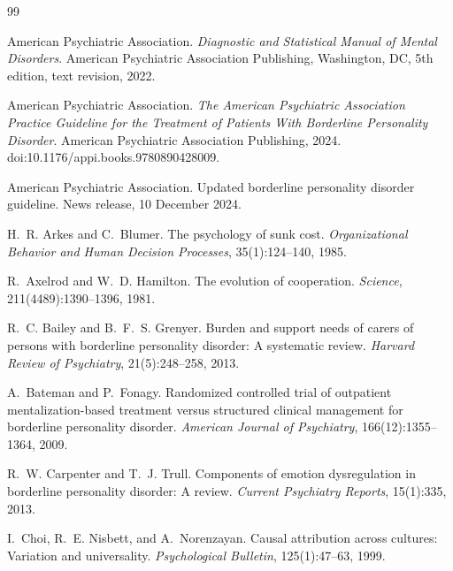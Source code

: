 \documentclass[11pt]{article}
\theoremstyle{definition}
\theoremstyle{remark}
\begin{document}
\begin{thebibliography}{99}
\setlength{\itemsep}{0.35em}

American Psychiatric Association.
\newblock \emph{Diagnostic and Statistical Manual of Mental Disorders}.
\newblock American Psychiatric Association Publishing, Washington, DC, 5th edition, text revision, 2022.

American Psychiatric Association.
\newblock \emph{The American Psychiatric Association Practice Guideline for the Treatment of Patients With Borderline Personality Disorder}.
\newblock American Psychiatric Association Publishing, 2024.
\newblock doi:10.1176/appi.books.9780890428009.

American Psychiatric Association.
\newblock Updated borderline personality disorder guideline.
\newblock News release, 10 December 2024.

H.~R. Arkes and C.~Blumer.
\newblock The psychology of sunk cost.
\newblock \emph{Organizational Behavior and Human Decision Processes}, 35(1):124--140, 1985.

R.~Axelrod and W.~D. Hamilton.
\newblock The evolution of cooperation.
\newblock \emph{Science}, 211(4489):1390--1396, 1981.

R.~C. Bailey and B.~F.~S. Grenyer.
\newblock Burden and support needs of carers of persons with borderline personality disorder: A systematic review.
\newblock \emph{Harvard Review of Psychiatry}, 21(5):248--258, 2013.

A.~Bateman and P.~Fonagy.
\newblock Randomized controlled trial of outpatient mentalization-based treatment versus structured clinical management for borderline personality disorder.
\newblock \emph{American Journal of Psychiatry}, 166(12):1355--1364, 2009.

R.~W. Carpenter and T.~J. Trull.
\newblock Components of emotion dysregulation in borderline personality disorder: A review.
\newblock \emph{Current Psychiatry Reports}, 15(1):335, 2013.

I.~Choi, R.~E. Nisbett, and A.~Norenzayan.
\newblock Causal attribution across cultures: Variation and universality.
\newblock \emph{Psychological Bulletin}, 125(1):47--63, 1999.


\end{thebibliography}
\end{document}
